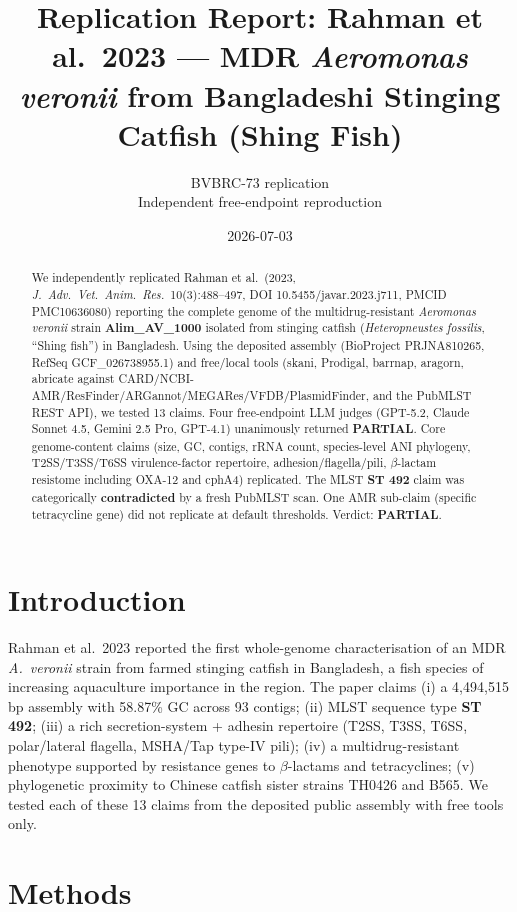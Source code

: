 \documentclass[11pt,letterpaper]{article}
\title{Replication Report: Rahman et al.\ 2023 --- MDR \textit{Aeromonas veronii} from Bangladeshi Stinging Catfish (Shing Fish)}
\author{BVBRC-73 replication \\ Independent free-endpoint reproduction}
\date{2026-07-03}
\begin{document}
\maketitle

\begin{abstract}
We independently replicated Rahman et al.\ (2023, \textit{J.\ Adv.\ Vet.\ Anim.\ Res.}\ 10(3):488--497, DOI 10.5455/javar.2023.j711, PMCID PMC10636080) reporting the complete genome of the multidrug-resistant \textit{Aeromonas veronii} strain \textbf{Alim\_AV\_1000} isolated from stinging catfish (\textit{Heteropneustes fossilis}, ``Shing fish'') in Bangladesh. Using the deposited assembly (BioProject PRJNA810265, RefSeq GCF\_026738955.1) and free/local tools (skani, Prodigal, barrnap, aragorn, abricate against CARD/NCBI-AMR/ResFinder/ARGannot/MEGARes/VFDB/PlasmidFinder, and the PubMLST REST API), we tested 13 claims. Four free-endpoint LLM judges (GPT-5.2, Claude Sonnet 4.5, Gemini 2.5 Pro, GPT-4.1) unanimously returned \textbf{PARTIAL}. Core genome-content claims (size, GC, contigs, rRNA count, species-level ANI phylogeny, T2SS/T3SS/T6SS virulence-factor repertoire, adhesion/flagella/pili, $\beta$-lactam resistome including OXA-12 and cphA4) replicated. The MLST \textbf{ST 492} claim was categorically \textbf{contradicted} by a fresh PubMLST scan. One AMR sub-claim (specific tetracycline gene) did not replicate at default thresholds. Verdict: \textbf{PARTIAL}.
\end{abstract}

\section{Introduction}
Rahman et al.\ 2023 reported the first whole-genome characterisation of an MDR \textit{A.\ veronii} strain from farmed stinging catfish in Bangladesh, a fish species of increasing aquaculture importance in the region. The paper claims (i) a 4{,}494{,}515 bp assembly with 58.87\% GC across 93 contigs; (ii) MLST sequence type \textbf{ST 492}; (iii) a rich secretion-system + adhesin repertoire (T2SS, T3SS, T6SS, polar/lateral flagella, MSHA/Tap type-IV pili); (iv) a multidrug-resistant phenotype supported by resistance genes to $\beta$-lactams and tetracyclines; (v) phylogenetic proximity to Chinese catfish sister strains TH0426 and B565. We tested each of these 13 claims from the deposited public assembly with free tools only.

\section{Methods}
\end{document}
